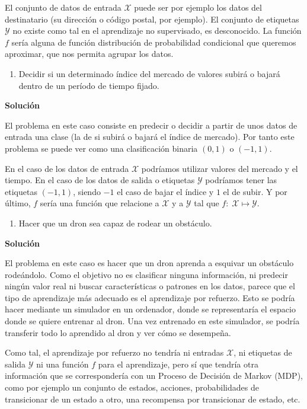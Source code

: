 \documentclass[11pt,a4paper]{article}
\newcommand{\answer}{\noindent\textbf{Solución}}
\begin{document}
El conjunto de datos de entrada $\mathcal{X}$ puede ser por ejemplo los datos del destinatario (su dirección o código postal,
por ejemplo). El conjunto de etiquetas $\mathcal{Y}$ no existe como tal en el aprendizaje no supervisado, es desconocido.
La función $f$ sería alguna de función distribución de probabilidad condicional que queremos aproximar, que nos
permita agrupar los datos.

\begin{enumerate}[resume,label=\textit{\alph*})]
	\item Decidir si un determinado índice del mercado de valores subirá o bajará dentro de un período de tiempo fijado.
\end{enumerate}

\answer

El problema en este caso consiste en predecir o decidir a partir de unos datos de entrada una clase (la de si subirá o bajará
el índice de mercado). Por tanto este problema se puede ver como una clasificación binaria $(0, 1)$ o $(-1, 1)$.

En el caso de los datos de entrada $\mathcal{X}$ podríamos utilizar valores del mercado y el tiempo. En el caso de los datos
de salida o etiquetas $\mathcal{Y}$ podríamos tener las etiquetas $(-1, 1)$, siendo $-1$ el caso de bajar el índice y $1$ el
de subir. Y por último, $f$ sería una función que relacione a $\mathcal{X}$ y a $\mathcal{Y}$ tal que $f: \; \mathcal{X}
\mapsto \mathcal{Y}$.

\begin{enumerate}[resume,label=\textit{\alph*})]
	\item Hacer que un dron sea capaz de rodear un obstáculo.
\end{enumerate}

\answer

El problema en este caso es hacer que un dron aprenda a esquivar un obstáculo rodeándolo. Como el objetivo no es clasificar
ninguna información, ni predecir ningún valor real ni buscar características o patrones en los datos, parece que el tipo
de aprendizaje más adecuado es el aprendizaje por refuerzo. Esto se podría hacer mediante un simulador en un ordenador, donde
se representaría el espacio donde se quiere entrenar al dron. Una vez entrenado en este simulador, se podría transferir todo
lo aprendido al dron y ver cómo se desempeña.

Como tal, el aprendizaje por refuerzo no tendría ni entradas $\mathcal{X}$, ni etiquetas de salida $\mathcal{Y}$ ni una
función $f$ para el aprendizaje, pero sí que tendría otra información que se correspondería con un Proceso de Decisión de
Markov (MDP), como por ejemplo un conjunto de estados, acciones, probabilidades de transicionar de un estado a otro, una
recompensa por transicionar de estado, etc.
\end{document}
